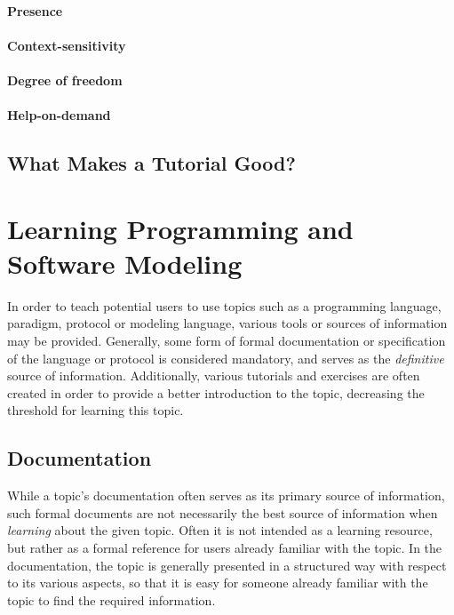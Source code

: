 \paragraph{Presence} 

\paragraph{Context-sensitivity}

\paragraph{Degree of freedom}

\paragraph{Help-on-demand}
 


\subsection{What Makes a Tutorial Good?}


\section{Learning Programming and Software Modeling}
\label{sec:learning_programming}
In order to teach potential users to use topics such as a programming language, paradigm, protocol or modeling language, various tools or sources of information may be provided. Generally, some form of formal documentation or specification of the language or protocol is considered mandatory, and serves as the \emph{definitive} source of information. Additionally, various tutorials and exercises are often created in order to provide a better introduction to the topic, decreasing the threshold for learning this topic.

\subsection{Documentation}
While a topic's documentation often serves as its primary source of information, such formal documents are not necessarily the best source of information when \emph{learning} about the given topic. Often it is not intended as a learning resource, but rather as a formal reference for users already familiar with the topic. In the documentation, the topic is generally presented in a structured way with respect to its various aspects, so that it is easy for someone already familiar with the topic to find the required information.

